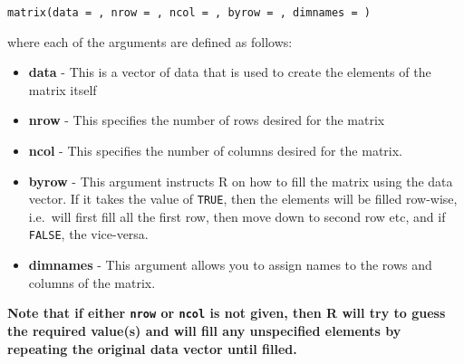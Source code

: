 \documentclass[
]{book}
\providecommand{\tightlist}{%
  \setlength{\itemsep}{0pt}\setlength{\parskip}{0pt}}
\theoremstyle{definition}
\theoremstyle{definition}
\theoremstyle{definition}
\theoremstyle{definition}
\theoremstyle{remark}
\begin{document}
\texttt{matrix(data\ =\ ,\ nrow\ =\ ,\ ncol\ =\ ,\ byrow\ =\ ,\ dimnames\ =\ )}

where each of the arguments are defined as follows:

\begin{itemize}
\tightlist
\item
  \textbf{data} - This is a vector of data that is used to create the elements of the matrix itself
\item
  \textbf{nrow} - This specifies the number of rows desired for the matrix
\item
  \textbf{ncol} - This specifies the number of columns desired for the matrix.
\item
  \textbf{byrow} - This argument instructs R on how to fill the matrix using the data vector. If it takes the value of \texttt{TRUE}, then the elements will be filled row-wise, i.e.~will first fill all the first row, then move down to second row etc, and if \texttt{FALSE}, the vice-versa.
\item
  \textbf{dimnames} - This argument allows you to assign names to the rows and columns of the matrix.
\end{itemize}

\textbf{Note that if either \texttt{nrow} or \texttt{ncol} is not given, then R will try to guess the required value(s) and will fill any unspecified elements by repeating the original data vector until filled.}
\end{document}
